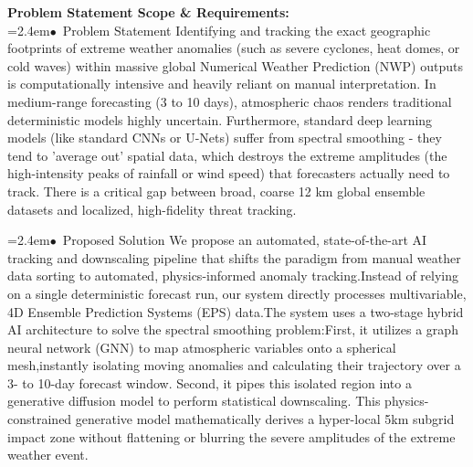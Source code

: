 \documentclass[10pt,a4paper]{article}
\begin{document}
\begin{tcolorbox}[pscard, title={"\textbf{SIH26078} \quad $\vert$ \quad AI-Driven Spatio-Temporal Tracking of Extreme Weather Anomalies in Medium-R...}]
\textbf{\color{sihnavy}Problem Statement Scope \& Requirements:}\\[0.15cm]
\noindent\hspace*{1.2em}\hangindent=2.4em\textcolor{sihblue}{$\bullet$}~\small Problem Statement Identifying and tracking the exact geographic footprints of extreme weather anomalies (such as severe cyclones, heat domes, or cold waves) within massive global Numerical Weather Prediction (NWP) outputs is computationally intensive and heavily reliant on manual interpretation. In medium-range forecasting (3 to 10 days), atmospheric chaos renders traditional deterministic models highly uncertain. Furthermore, standard deep learning models (like standard CNNs or U-Nets) suffer from spectral smoothing - they tend to 'average out' spatial data, which destroys the extreme amplitudes (the high-intensity peaks of rainfall or wind speed) that forecasters actually need to track. There is a critical gap between broad, coarse 12 km global ensemble datasets and localized, high-fidelity threat tracking.\par\vspace{0.05cm}
\noindent\hspace*{1.2em}\hangindent=2.4em\textcolor{sihblue}{$\bullet$}~\small Proposed Solution We propose an automated, state-of-the-art AI tracking and downscaling pipeline that shifts the paradigm from manual weather data sorting to automated, physics-informed anomaly tracking.Instead of relying on a single deterministic forecast run, our system directly processes multivariable, 4D Ensemble Prediction Systems (EPS) data.The system uses a two-stage hybrid AI architecture to solve the spectral smoothing problem:First, it utilizes a graph neural network (GNN) to map atmospheric variables onto a spherical mesh,instantly isolating moving anomalies and calculating their trajectory over a 3- to 10-day forecast window. Second, it pipes this isolated region into a generative diffusion model to perform statistical downscaling. This physics-constrained generative model mathematically derives a hyper-local 5km subgrid impact zone without flattening or blurring the severe amplitudes of the extreme weather event.\par\vspace{0.05cm}

\end{tcolorbox}
\end{document}
